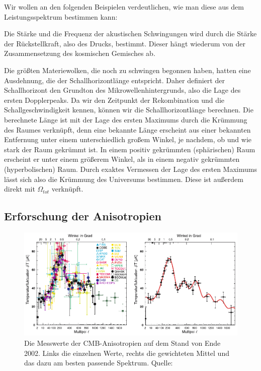 \documentclass[10pt,a4paper]{article}
\begin{document}
Wir wollen an den folgenden Beispielen verdeutlichen, wie man diese aus dem Leistungsspektrum bestimmen kann:

Die Stärke und die Frequenz der akustischen Schwingungen wird durch die Stärke der Rückstellkraft, also des Drucks, bestimmt. Dieser hängt wiederum von der Zusammensetzung des kosmischen Gemisches ab.\cite{S+W00}

Die größten Materiewolken, die noch zu schwingen begonnen haben, hatten eine Ausdehnung, die der Schallhorizontlänge entspricht. Daher definiert der Schallhorizont den Grundton des Mikrowellenhintergrunds, also die Lage des ersten Dopplerpeaks. Da wir den Zeitpunkt der Rekombination und die Schallgeschwindigkeit kennen, können wir die Schallhorizontlänge berechnen. Die berechnete Länge ist mit der Lage des ersten Maximums durch die Krümmung des Raumes verknüpft, denn eine bekannte Länge erscheint aus einer bekannten Entfernung unter einem unterschiedlich großem Winkel, je nachdem, ob und wie stark der Raum gekrümmt ist. In einem positiv gekrümmten (sphärischen) Raum erscheint er unter einem größerem Winkel, als in einem negativ gekrümmten (hyperbolischen) Raum. Durch exaktes Vermessen der Lage des ersten Maximums lässt sich also die Krümmung des Universums bestimmen. Diese ist außerdem direkt mit $\Omega_{tot}$ verknüpft.\cite{S+W03} %


\subsection{Erforschung der Anisotropien}\label{Missionen}
\begin{figure}
\center
\includegraphics[scale=1]{mess}
\caption{Die Messwerte der CMB-Anisotropien auf dem Stand von Ende 2002. Links die einzelnen Werte, rechts die gewichteten Mittel und das dazu am besten passende Spektrum. Quelle: \cite{Schneider}}
\label{mess}
\end{figure}
\end{document}
